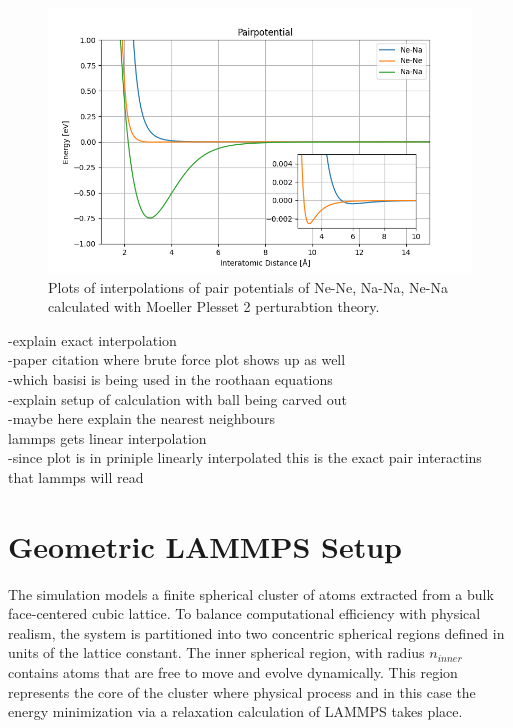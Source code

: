 \begin{figure}[h!]
	\centering
	\includegraphics[scale = 0.7]{Inhalt/Bilder/pairpotential.png}
	\caption{Plots of interpolations of pair potentials of Ne-Ne, Na-Na, Ne-Na calculated with Moeller Plesset 2 perturabtion theory.}
	\label{fig:pairpotential}
\end{figure}
-explain exact interpolation\\
-paper citation where brute force plot shows up as well\\
-which basisi is being used in the roothaan equations \\
-explain setup of calculation with ball being carved out\\
-maybe here explain the nearest neighbours\\
lammps gets linear interpolation\\
-since plot is in priniple linearly interpolated this is the exact pair interactins that lammps will read
\section{Geometric \ac{LAMMPS} Setup}
The simulation models a finite spherical cluster of atoms extracted from a bulk face-centered cubic lattice. To balance computational efficiency with physical realism, the system is partitioned into two concentric spherical regions defined in units of the lattice constant. The inner spherical region, with radius $n_{inner}$ contains atoms that are free to move and evolve dynamically. This region represents the core of the cluster where physical process and in this case the energy minimization via a relaxation calculation of \ac{LAMMPS} takes place.

